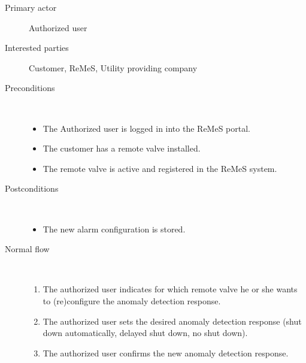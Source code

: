 \begin{description}
	\item[Primary actor] Authorized user
	\item[Interested parties] Customer, ReMeS, Utility providing company
	\item[Preconditions] \ 
	\begin{itemize}
		\item The Authorized user is logged in into the ReMeS portal.
		\item The customer has a remote valve installed.
		\item The remote valve is active and registered in the ReMeS system.
	\end{itemize}
	\item[Postconditions] \ 
	\begin{itemize}
		\item The new alarm configuration is stored.
	\end{itemize}
	\item[Normal flow] \ 
	\begin{enumerate}
	  	\item The authorized user indicates for which remote valve he or she wants
	  	to (re)configure the anomaly detection response.
	  	\item The authorized user sets the desired anomaly detection response (shut down
	  	automatically, delayed shut down, no shut down).
	  	\item The authorized user confirms the new anomaly detection response.
	\end{enumerate}
\end{description}